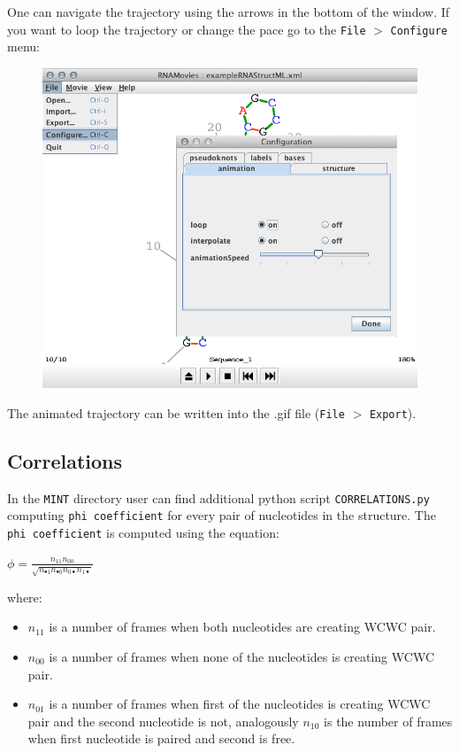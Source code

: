\documentclass[12pt]{article}
\begin{document}
One can navigate the trajectory using the arrows in the bottom of the window. If you want to loop the trajectory or change the pace go to the \texttt{File} $>$ \texttt{Configure} menu: 
\begin{figure}[h!]
\centering
\includegraphics[scale=0.4]{./pictures/RNAmovies_3.png}
\end{figure}
\newpage
The animated trajectory can be written into the .gif file  (\texttt{File} $>$ \texttt{Export}).

\subsection{Correlations}
In the \texttt{MINT} directory user can find additional python script \texttt{CORRELATIONS.py} computing \texttt{phi coefficient} for every pair of nucleotides in the structure. The \texttt{phi coefficient} is computed using the equation:
\begin{center}
\begin{large}
$ \phi = \frac{n_{11}n_{00}}{\sqrt{n_{\bullet1}n_{\bullet0} n_{0\bullet}n_{1\bullet}}}$
\end{large}
\end{center}

where:
\begin{itemize}
\item $n_{11}$ is a number of frames when both nucleotides are creating WCWC pair.
\item $n_{00}$ is a number of frames when none of the nucleotides is creating WCWC pair.
\item $n_{01}$ is a number of frames when first of the nucleotides is creating WCWC pair and the second nucleotide is not, analogously $n_{10}$ is the number of frames when first nucleotide is paired and second is free.
\end{itemize}
\end{document}
